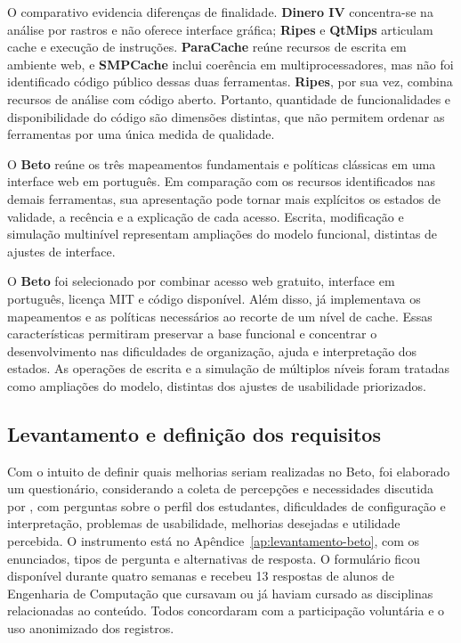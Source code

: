O comparativo evidencia diferenças de finalidade. \textbf{Dinero IV} concentra-se na análise por rastros e não oferece interface gráfica; \textbf{Ripes} e \textbf{QtMips} articulam cache e execução de instruções. \textbf{ParaCache} reúne recursos de escrita em ambiente web, e \textbf{SMPCache} inclui coerência em multiprocessadores, mas não foi identificado código público dessas duas ferramentas. \textbf{Ripes}, por sua vez, combina recursos de análise com código aberto. Portanto, quantidade de funcionalidades e disponibilidade do código são dimensões distintas, que não permitem ordenar as ferramentas por uma única medida de qualidade.

O \textbf{Beto} reúne os três mapeamentos fundamentais e políticas clássicas em uma interface web em português. Em comparação com os recursos identificados nas demais ferramentas, sua apresentação pode tornar mais explícitos os estados de validade, a recência e a explicação de cada acesso. Escrita, modificação e simulação multinível representam ampliações do modelo funcional, distintas de ajustes de interface.


O \textbf{Beto} foi selecionado por combinar acesso web gratuito, interface em português, licença MIT e código disponível. Além disso, já implementava os mapeamentos e as políticas necessários ao recorte de um nível de cache. Essas características permitiram preservar a base funcional e concentrar o desenvolvimento nas dificuldades de organização, ajuda e interpretação dos estados. As operações de escrita e a simulação de múltiplos níveis foram tratadas como ampliações do modelo, distintas dos ajustes de usabilidade priorizados.

\subsection{Levantamento e definição dos requisitos}
\label{sec:resultados-levantamento}

Com o intuito de definir quais melhorias seriam realizadas no Beto, foi elaborado um questionário, considerando a coleta de percepções e necessidades discutida por , com perguntas sobre o perfil dos estudantes, dificuldades de configuração e interpretação, problemas de usabilidade, melhorias desejadas e utilidade percebida. O instrumento está no Apêndice~\ref{ap:levantamento-beto}, com os enunciados, tipos de pergunta e alternativas de resposta. O formulário ficou disponível durante quatro semanas e recebeu 13 respostas de alunos de Engenharia de Computação que cursavam ou já haviam cursado as disciplinas relacionadas ao conteúdo. Todos concordaram com a participação voluntária e o uso anonimizado dos registros.

